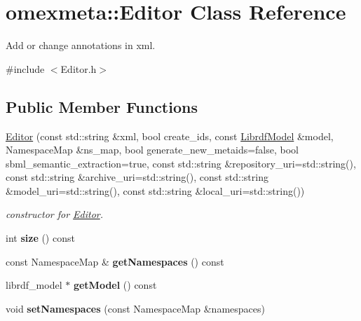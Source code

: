 \hypertarget{classomexmeta_1_1Editor}{}\section{omexmeta\+:\+:Editor Class Reference}
\label{classomexmeta_1_1Editor}


Add or change annotations in xml.  




{\ttfamily \#include $<$Editor.\+h$>$}

\subsection*{Public Member Functions}
\begin{DoxyCompactItemize}
\item 
\hyperlink{classomexmeta_1_1Editor_a6ac976c1a3762f77a577b5735cd509f4}{Editor} (const std\+::string \&xml, bool create\+\_\+ids, const \hyperlink{classredland_1_1LibrdfModel}{Librdf\+Model} \&model, Namespace\+Map \&ns\+\_\+map, bool generate\+\_\+new\+\_\+metaids=false, bool sbml\+\_\+semantic\+\_\+extraction=true, const std\+::string \&repository\+\_\+uri=std\+::string(), const std\+::string \&archive\+\_\+uri=std\+::string(), const std\+::string \&model\+\_\+uri=std\+::string(), const std\+::string \&local\+\_\+uri=std\+::string())
\begin{DoxyCompactList}\small\item\em constructor for \hyperlink{classomexmeta_1_1Editor}{Editor}. \end{DoxyCompactList}\item 
\mbox{\label{classomexmeta_1_1Editor_ab5b39f1f137312ce77575e73a86dfb05}} 
int {\bfseries size} () const
\item 
\mbox{\label{classomexmeta_1_1Editor_a514443fe99a6e52154d1fe4f7ec94618}} 
const Namespace\+Map \& {\bfseries get\+Namespaces} () const
\item 
\mbox{\label{classomexmeta_1_1Editor_a4b2610fb802eb306349d69ae6fde60c0}} 
librdf\+\_\+model $\ast$ {\bfseries get\+Model} () const
\item 
\mbox{\label{classomexmeta_1_1Editor_a83836e19bb1de9c7df69d36e8b61b2b2}} 
void {\bfseries set\+Namespaces} (const Namespace\+Map \&namespaces)

\end{DoxyCompactItemize}
